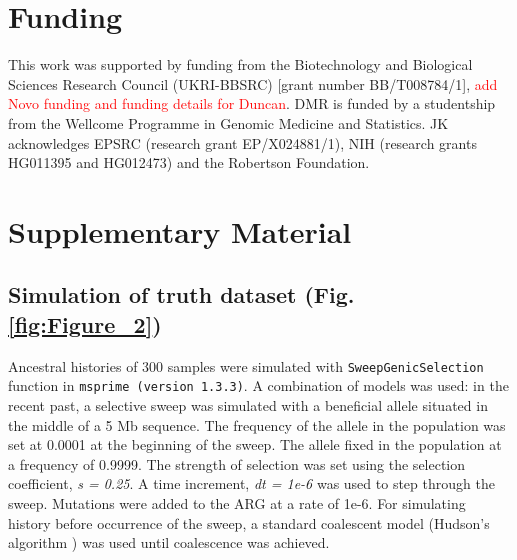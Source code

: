 \documentclass[unnumsec,webpdf,contemporary,large,namedate]{oup-authoring-template}%
\begin{document}

\section*{Funding}
This work was supported by funding from the Biotechnology and Biological
Sciences Research Council (UKRI-BBSRC) [grant number BB/T008784/1],
\textcolor{red}{add Novo funding and funding details for Duncan}. DMR is funded by 
a studentship from the Wellcome Programme in Genomic Medicine and Statistics.
JK acknowledges EPSRC (research grant EP/X024881/1),
NIH (research grants HG011395 and HG012473)
and the Robertson Foundation.




\clearpage \onecolumn \setcounter{figure}{0}  %
\renewcommand{\thefigure}{S\arabic{figure}}  

\section{Supplementary Material} 
\subsection{Simulation of truth dataset (Fig. \ref{fig:Figure_2})} \label{subsec:sweep_simulation} 
Ancestral
histories of 300 samples were simulated with \texttt{SweepGenicSelection}
function in \texttt{msprime (version 1.3.3)}. A combination of models was used:
in the recent past, a selective sweep was simulated with a beneficial allele
situated in the middle of a 5 Mb sequence. The frequency of the allele in the
population was set at 0.0001 at the beginning of the sweep. The allele fixed in
the population at a frequency of 0.9999. The strength of selection was set
using the selection coefficient, \textit{s = 0.25}. A time increment,
\textit{dt = 1e-6} was used to step through the sweep. Mutations were added to
the ARG at a rate of 1e-6. For simulating history before occurrence of the
sweep, a standard coalescent model (Hudson's algorithm \citep{Hudson1983}) was
used until coalescence was achieved. 
\end{document}
